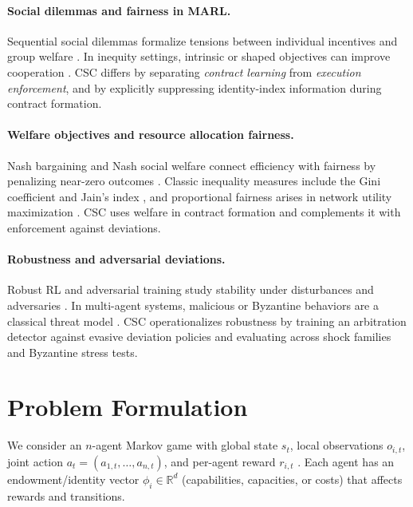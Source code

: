 \documentclass{article}
\theoremstyle{definition}
\theoremstyle{plain}
\theoremstyle{remark}
\begin{document}
\paragraph{Social dilemmas and fairness in MARL.}
Sequential social dilemmas formalize tensions between individual incentives and group welfare \citep{leibo2017multiagent}.
In inequity settings, intrinsic or shaped objectives can improve cooperation \citep{hughes2018inequity,jaques2019socialinfluence}.
CSC differs by separating \emph{contract learning} from \emph{execution enforcement}, and by explicitly suppressing identity-index information during contract formation.

\paragraph{Welfare objectives and resource allocation fairness.}
Nash bargaining and Nash social welfare connect efficiency with fairness by penalizing near-zero outcomes \citep{nash1950bargaining,kalai1975other}.
Classic inequality measures include the Gini coefficient \citep{gini1912variabilita} and Jain's index \citep{jain1984fairness}, and proportional fairness arises in network utility maximization \citep{kelly1997charging,mo2000fair}.
CSC uses welfare in contract formation and complements it with enforcement against deviations.

\paragraph{Robustness and adversarial deviations.}
Robust RL and adversarial training study stability under disturbances and adversaries \citep{pinto2017robust,behzadan2017vulnerabilities}.
In multi-agent systems, malicious or Byzantine behaviors are a classical threat model \citep{lamport1982byzantine}.
CSC operationalizes robustness by training an arbitration detector against evasive deviation policies and evaluating across shock families and Byzantine stress tests.

\section{Problem Formulation}
\label{sec:problem}

We consider an $n$-agent Markov game with global state $s_t$, local observations $o_{i,t}$, joint action $a_t=(a_{1,t},\dots,a_{n,t})$, and per-agent reward $r_{i,t}$ \citep{shapley1953stochastic,littman1994markov}.
Each agent has an endowment/identity vector $\phi_i \in \mathbb{R}^d$ (capabilities, capacities, or costs) that affects rewards and transitions.
\end{document}
